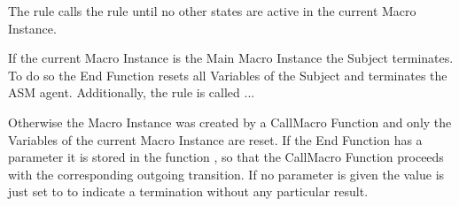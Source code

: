The  rule calls the  rule
until no other states are active in the current Macro Instance.

If the current Macro Instance is the Main Macro Instance the Subject terminates.
To do so the End Function resets all Variables of the Subject and terminates the
ASM agent.
Additionally, the  rule is called ... %

Otherwise the Macro Instance was created by a CallMacro Function and only the
Variables of the current Macro Instance are reset. If the End Function has a
parameter it is stored in the function , so
that the CallMacro Function proceeds with the corresponding outgoing transition.
If no parameter is given the value is just set to  to indicate a
termination without any particular result.


